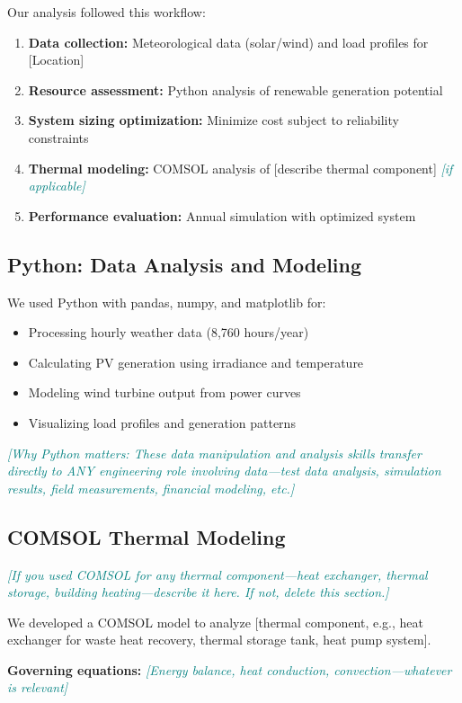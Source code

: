 \documentclass[11pt,letterpaper]{article}
\newcommand{\hint}[1]{\textcolor{teal}{\small\textit{[#1]}}}
\begin{document}
Our analysis followed this workflow:
\begin{enumerate}
    \item \textbf{Data collection:} Meteorological data (solar/wind) and load profiles for [Location]
    \item \textbf{Resource assessment:} Python analysis of renewable generation potential
    \item \textbf{System sizing optimization:} Minimize cost subject to reliability constraints
    \item \textbf{Thermal modeling:} COMSOL analysis of [describe thermal component] \hint{if applicable}
    \item \textbf{Performance evaluation:} Annual simulation with optimized system
\end{enumerate}
\subsection{Python: Data Analysis and Modeling}

We used Python with pandas, numpy, and matplotlib for:
\begin{itemize}
    \item Processing hourly weather data (8,760 hours/year)
    \item Calculating PV generation using irradiance and temperature
    \item Modeling wind turbine output from power curves
    \item Visualizing load profiles and generation patterns
\end{itemize}

\hint{Why Python matters: These data manipulation and analysis skills transfer directly to ANY engineering role involving data—test data analysis, simulation results, field measurements, financial modeling, etc.}

\subsection{COMSOL Thermal Modeling}

\hint{If you used COMSOL for any thermal component—heat exchanger, thermal storage, building heating—describe it here. If not, delete this section.}

We developed a COMSOL model to analyze [thermal component, e.g., heat exchanger for waste heat recovery, thermal storage tank, heat pump system].

\textbf{Governing equations:} \hint{Energy balance, heat conduction, convection—whatever is relevant}
\end{document}

